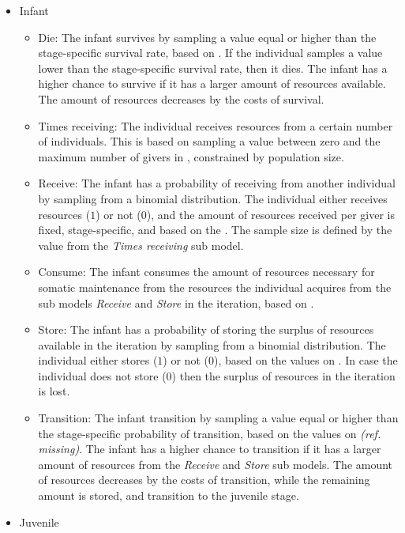 \documentclass{article}
\begin{document}
\begin{itemize}
    \item Infant
    \begin{itemize}
        \item Die: The infant survives by sampling a value equal or higher than the stage-specific survival rate, based on \cite{gurven2007longevity}. If the individual samples a value lower than the stage-specific survival rate, then it dies. The infant has a higher chance to survive if it has a larger amount of resources available. The amount of resources decreases by the costs of survival.
        \item Times receiving: The individual receives resources from a certain number of individuals. This is based on sampling a value between zero and the maximum number of givers in \cite{gurven2004give}, constrained by population size.
        \item Receive: The infant has a probability of receiving from another individual by sampling from a binomial distribution. The individual either receives resources ($1$) or not ($0$), and the amount of resources received per giver is fixed, stage-specific, and based on the \cite{gurven2004give}. The sample size is defined by the value from the \emph{Times receiving} sub model. 
        \item Consume: The infant consumes the amount of resources necessary for somatic maintenance from the resources the individual acquires from the sub models  \emph{Receive} and \emph{Store} in the iteration, based on \cite{kaplan2000theory, pontzer2021daily}.
        \item Store: The infant has a probability of storing the surplus of resources available in the iteration by sampling from a binomial distribution. The individual either stores ($1$) or not ($0$), based on the values on \citep{bowles2011cultivation}. In case the individual does not store ($0$) then the surplus  of resources in the iteration is lost.
        \item Transition: The infant transition by sampling a value equal or higher than the stage-specific probability of transition, based on the values on \emph{(ref. missing)}. The infant has a higher chance to transition if it has a larger amount of resources from the \emph{Receive} and \emph{Store} sub models. The amount of resources decreases by the costs of transition, while the remaining amount is stored, and transition to the juvenile stage.
    \end{itemize}
    \item Juvenile

\end{itemize}
\end{document}
